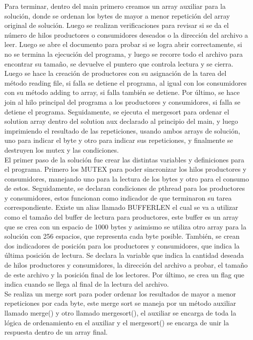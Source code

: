 \documentclass[10pt, article, natbib]{IEEEtran}
\begin{document}
Para terminar, dentro del main primero creamos un array auxiliar para la solución, donde se ordenan los bytes de mayor a menor repetición del array original de solución. Luego se realizan verificaciones para revisar si se da el número de hilos productores o consumidores deseados o la dirección del archivo a leer. Luego se abre el documento para probar si se logra abrir correctamente, si no se termina la ejecución del programa, y luego se recorre todo el archivo para encontrar su tamaño, se devuelve el puntero que controla lectura y se cierra. Luego se hace la creación de productores con su asignación de la tarea del método reading file, si falla se detiene el programa, al igual con los consumidores con su método adding to array, si falla también se detiene. Por último, se hace join al hilo principal del programa a los productores y consumidores, si falla se detiene el programa.\cite{kerrisk_2010_pthread_join3} Seguidamente, se ejecuta el mergesort para ordenar el solution array dentro del solution aux declarado al principio del main, y luego imprimiendo el resultado de las repeticiones, usando ambos arrays de solución, uno para indicar el byte y otro para indicar sus repeticiones, y finalmente se destruyen los mutex y las condiciones.\\
El primer paso de la solución fue crear las distintas variables y definiciones para el programa. Primero los MUTEX para poder sincronizar los hilos productores y consumidores, manejando uno para la lectura de los bytes y otro para el consumo de estos.\cite{cppdev_2010_c} \cite{manrow_2011_c} Seguidamente, se declaran condiciones de pthread para los productores y consumidores, estos funcionan como indicador de que terminaron su tarea correspondiente.\cite{theopengroup_1997_pthread_cond_wait} Existe un alias llamado BUFFERLEN el cual se va a utilizar como el tamaño del buffer de lectura para productores, este buffer es un array que se crea con un espacio de 1000 bytes y asimismo se utiliza otro array para la solución con 256 espacios, que representa cada byte posible. También, se crean dos indicadores de posición para los productores y consumidores, que indica la última posición de lectura. Se declara la variable que indica la cantidad deseada de hilos productores y consumidores, la dirección del archivo a probar, el tamaño de este archivo y la posición final de los lectores. Por último, se crea un flag que indica cuando se llega al final de la lectura del archivo.\\

Se realiza un merge sort para poder ordenar los resultados de mayor a menor repeticiones por cada byte, este merge sort se maneja por un método auxiliar llamado merge() y otro llamado mergesort(), el auxiliar se encarga de toda la lógica de ordenamiento en el auxiliar y el mergesort() se encarga de unir la respuesta dentro de un array final.\\
\end{document}

